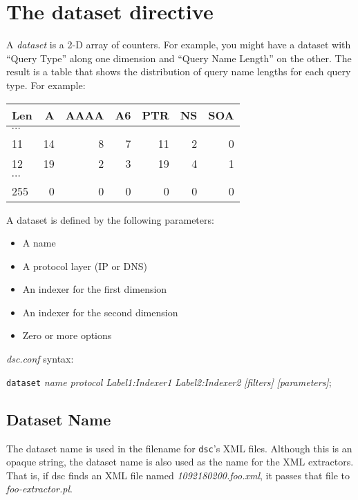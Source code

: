 \documentclass{report}
\def\dsc{{\sc dsc}}
\begin{document}
\section{The dataset directive}

A {\em dataset\/} is a 2-D array of counters.  For example, you
might have a dataset with ``Query Type'' along one dimension and
``Query Name Length'' on the other.  The result is a table that
shows the distribution of query name lengths for each query type.
For example:

\vspace{1ex}
\begin{center}
\begin{tabular}{l|rrrrrr}
Len & A & AAAA & A6 & PTR & NS & SOA \\
\hline
$\cdots$ & & & & & \\
11 & 14 & 8 & 7 & 11 & 2 & 0 \\
12 & 19 & 2 & 3 & 19 & 4 & 1 \\
$\cdots$ & & & & & & \\
255 & 0 & 0 & 0 & 0 & 0 & 0 \\
\hline
\end{tabular}
\end{center}
\vspace{1ex}

\noindent
A dataset is defined by the following parameters:
\begin{itemize}
\item A name
\item A protocol layer (IP or DNS)
\item An indexer for the first dimension
\item An indexer for the second dimension
\item Zero or more options
\end{itemize}

\noindent
{\em dsc.conf\/} syntax:

{\tt dataset\/}
{\em name\/}
{\em protocol\/}
{\em Label1:Indexer1\/}
{\em Label2:Indexer2\/}
{\em [filters]\/} 
{\em [parameters]\/};
\vspace{2ex}

\subsection{Dataset Name}

The dataset name is used in the filename for {\tt dsc\/}'s XML
files.  Although this is an opaque string, the dataset name is also
used as the name for the XML extractors.  That is, if {\dsc} finds
an XML file named {\em 1092180200.foo.xml\/}, it passes that file
to {\em foo-extractor.pl\/}.
\end{document}
